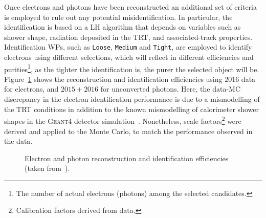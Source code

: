 			Once electrons and photons have been reconstructed an additional set of criteria is employed to rule out any potential misidentification. In particular, the identification is based on a \ac{LH} algorithm that depends on variables such as shower shape, radiation deposited in the \ac{TRT}, and associated-track properties. Identification \acp{WP}, such as \texttt{Loose}, \texttt{Medium} and \texttt{Tight}, are employed to identify electrons using different selections, which will reflect in different efficiencies and purities\footnote{The number of actual electrons (photons) among the selected candidates.}, as the tighter the identification is, the purer the selected object will be. Figure~\ref{fig:ElPhIDEff} shows the reconstruction and identification efficiencies using $2016$ data for electrons, and $2015+2016$ for unconverted photons. Here, the data-\ac{MC} discrepancy in the electron identification performance is due to a mismodelling of the \ac{TRT} conditions in addition to the known mismodelling of calorimeter shower shapes in the \textsc{Geant4} detector simulation~\cite{PubEGAMMA}. Nonetheless, scale factors\footnote{Calibration factors derived from data.} were derived and applied to the Monte Carlo, to match the performance observed in the data.

			\begin{figure}[!htb]
				\begin{center}
					\hspace{0.05\textwidth}
				\end{center}
				\caption{Electron and photon reconstruction and identification efficiencies (taken from~\cite{PubEGAMMA}).}
				\label{fig:ElPhIDEff}
			\end{figure}

